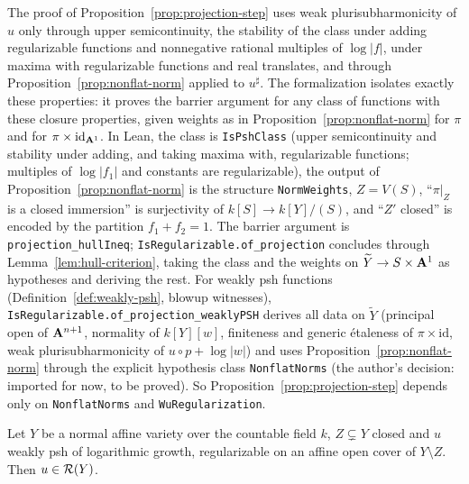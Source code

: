 \begin{remark}\label{rmk:projection-step-conditional}
The proof of Proposition~\ref{prop:projection-step} uses weak plurisubharmonicity of $u$ only through
upper semicontinuity, the stability of the class under adding regularizable functions and nonnegative
rational multiples of $\log|f|$, under maxima with regularizable functions and real translates, and
through Proposition~\ref{prop:nonflat-norm} applied to $u^\sharp$. The formalization isolates exactly
these properties: it proves the barrier argument for any class of functions with these closure
properties, given weights as in Proposition~\ref{prop:nonflat-norm} for $\pi$ and for
$\pi\times\mathrm{id}_{\mathbf{A}^1}$. In Lean, the class is \texttt{IsPshClass} (upper semicontinuity and
stability under adding, and taking maxima with, regularizable functions; multiples of $\log|f_1|$ and
constants are regularizable), the output of Proposition~\ref{prop:nonflat-norm} is the structure
\texttt{NormWeights}, $Z=V(S)$, ``$\pi|_Z$ is a closed immersion'' is surjectivity of
$k[S]\to k[Y]/(S)$, and ``$Z'$ closed'' is encoded by the partition $f_1+f_2=1$. The barrier argument
is \texttt{projection\_hullIneq}; \texttt{IsRegularizable.of\_projection} concludes through
Lemma~\ref{lem:hull-criterion}, taking the class and the weights on $\widetilde Y\to S\times\mathbf{A}^1$ as
hypotheses and deriving the rest. For weakly psh functions (Definition~\ref{def:weakly-psh}, blowup witnesses),
\texttt{IsRegularizable.of\_projection\_weaklyPSH} derives all data on $\widetilde Y$ (principal open of
$\mathbf{A}^{n+1}$, normality of $k[Y][w]$, finiteness and generic \'etaleness of $\pi\times\mathrm{id}$, weak
plurisubharmonicity of $u\circ p+\log|w|$) and uses Proposition~\ref{prop:nonflat-norm} through the
explicit hypothesis class \texttt{NonflatNorms} (the author's decision: imported for now, to be
proved). So Proposition~\ref{prop:projection-step} depends only on \texttt{NonflatNorms} and
\texttt{WuRegularization}.
\end{remark}

\begin{theorem}\label{thm:normal-local-regularization}
Let $Y$ be a normal affine variety over the countable field $k$, $Z\subsetneq Y$ closed and $u$
weakly psh of logarithmic growth, regularizable on an affine open cover of $Y\setminus Z$. Then
$u\in\mathcal{R}(Y)$.
\end{theorem}

